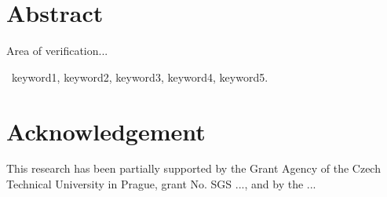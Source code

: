 \section*{Abstract}

Area of verification...

\bigskip


~keyword1, keyword2, keyword3, keyword4, keyword5.

\vfill

\section*{Acknowledgement}
This research has been partially supported 
by the Grant Agency of the Czech Technical University in Prague, grant No. SGS ..., and
by the ...
